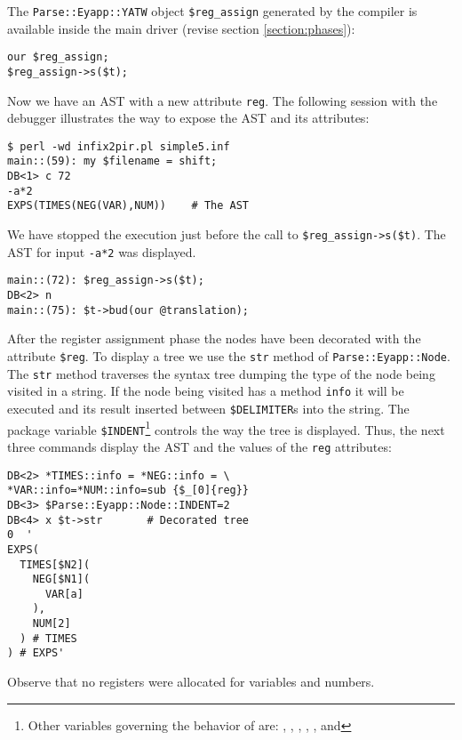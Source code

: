 The \verb|Parse::Eyapp::YATW| object \verb|$reg_assign|
generated by the compiler is available inside
the main driver (revise section \ref{section:phases}):
\begin{verbatim}
our $reg_assign;
$reg_assign->s($t);
\end{verbatim}
Now we have an AST  with a new attribute \verb|reg|.
The following session with the debugger illustrates 
the way to expose the AST and its attributes:
\begin{verbatim}
$ perl -wd infix2pir.pl simple5.inf
main::(59): my $filename = shift;
DB<1> c 72    
-a*2        
EXPS(TIMES(NEG(VAR),NUM))    # The AST
\end{verbatim}
We have stopped the execution just before the 
call to \verb|$reg_assign->s($t)|. The AST
for input \verb|-a*2| was displayed.
\begin{verbatim}
main::(72): $reg_assign->s($t);
DB<2> n
main::(75): $t->bud(our @translation);
\end{verbatim}
After the register assignment phase
the nodes have been decorated with
the attribute \verb|$reg|. To display
a tree we use the \verb|str| method
of \verb|Parse::Eyapp::Node|. 
The \verb|str| method traverses the syntax tree dumping the type
of the node being visited in a string. If the node being visited
has a method \verb|info| it will
be executed and its result inserted between \verb|$DELIMITER|s
into the string. The package variable 
\verb|$INDENT|\footnote{Other 
variables governing the behavior of  are:
\code{\@PREFIXES},
,
,
,
,
and
}
controls the way the tree is displayed. Thus, the next three commands
display the AST and the values of the \verb|reg| attributes:
\begin{verbatim}
DB<2> *TIMES::info = *NEG::info = \
*VAR::info=*NUM::info=sub {$_[0]{reg}}
DB<3> $Parse::Eyapp::Node::INDENT=2
DB<4> x $t->str       # Decorated tree
0  '
EXPS(
  TIMES[$N2](
    NEG[$N1](
      VAR[a]
    ),
    NUM[2]
  ) # TIMES
) # EXPS'
\end{verbatim}
Observe that no registers
were allocated for variables and numbers.

